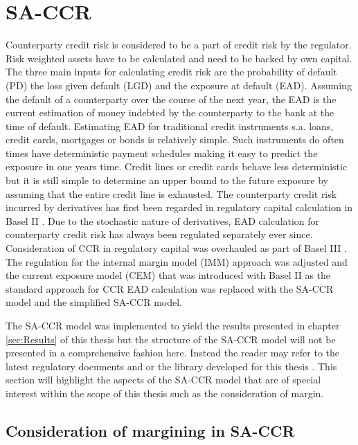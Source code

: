 \documentclass[../Thesis_AHoecherl.tex]{subfiles}
\begin{document}
\section{SA-CCR}\label{SA-CCR}

Counterparty credit risk is considered to be a part of credit risk by the regulator. Risk weighted assets have to be calculated and need to be backed by own capital. The three main inputs for calculating credit risk are the probability of default (PD) the loss given default (LGD) and the exposure at default (EAD). Assuming the default of a counterparty over the course of the next year, the \gls{EAD} is the current estimation of money indebted by the counterparty to the bank at the time of default. Estimating \gls{EAD} for traditional credit instruments s.a. loans, credit cards, mortgages or bonds is relatively simple. Such instruments do often times have deterministic payment schedules making it easy to predict the exposure in one years time. Credit lines or credit cards behave less deterministic but it is still simple to determine an upper bound to the future exposure by assuming that the entire credit line is exhausted.
The counterparty credit risk incurred by derivatives has first been regarded in regulatory capital calculation in Basel II \cite{basel2}. Due to the stochastic nature of derivatives, \gls{EAD} calculation for counterparty credit risk has always been regulated separately ever since. Consideration of \gls{CCR} in regulatory capital was overhauled as part of Basel III \cite{CRE}. The regulation for the internal margin model (\gls{IMM}) approach was adjusted and the current exposure model (\gls{CEM}) that was introduced with Basel II as the standard approach for \gls{CCR} \gls{EAD} calculation was replaced with the \gls{SA-CCR} model and the simplified \gls{SA-CCR} model.

The \gls{SA-CCR} model was implemented to yield the results presented in chapter \ref{sec:Results} of this thesis but the structure of the \gls{SA-CCR} model will not be presented in a comprehensive fashion here. Instead the reader may refer to the latest regulatory documents \cite[Article 274 and following]{CRRII} and \cite{EBA_2019} or the library developed for this thesis \cite{Hoecherl2020}.
This section will highlight the aspects of the \gls{SA-CCR} model that are of special interest within the scope of this thesis such as the consideration of margin. 

\subsection{Consideration of margining in SA-CCR}
\end{document}
